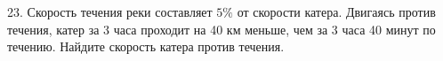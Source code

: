 23. Скорость течения реки составляет $5\%$ от скорости катера. Двигаясь против течения, катер за 3 часа проходит на 40 км меньше, чем за 3 часа 40 минут по течению. Найдите скорость катера против течения.\\
